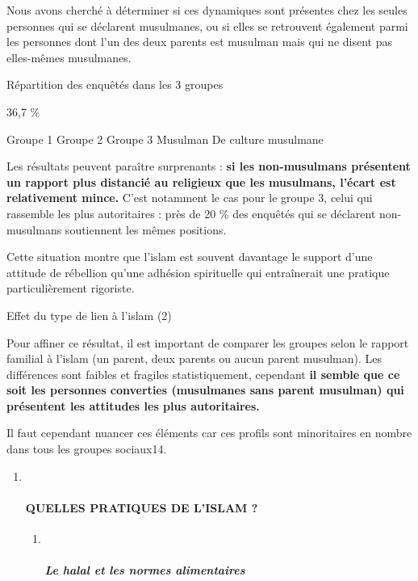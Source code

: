 Nous avons cherché à déterminer si ces dynamiques sont présentes chez
les seules personnes qui se déclarent musulmanes, ou si elles se
retrouvent également parmi les personnes dont l'un des deux parents est
musulman mais qui ne disent pas elles-mêmes musulmanes.


Répartition des enquêtés dans les 3 groupes


36,7 \%

Groupe 1 Groupe 2 Groupe 3 Musulman De culture musulmane

Les résultats peuvent paraître surprenants : \textbf{si les
non-musulmans présentent un rapport plus distancié au religieux que les
musulmans, l'écart est relativement mince.} C'est notamment le cas pour
le groupe 3, celui qui rassemble les plus autoritaires : près de 20 \%
des enquêtés qui se déclarent non-musulmans soutiennent les mêmes
positions.



Cette situation montre que l'islam est souvent davantage le support
d'une attitude de rébellion qu'une adhésion spirituelle qui entraînerait
une pratique particulièrement rigoriste.


Effet du type de lien à l'islam (2)


Pour affiner ce résultat, il est important de comparer les groupes selon
le rapport familial à l'islam (un parent, deux parents ou aucun parent
musulman). Les différences sont faibles et fragiles statistiquement,
cependant \textbf{il semble que ce soit les personnes converties
(musulmanes sans parent musulman) qui présentent les attitudes les plus
autoritaires.}

Il faut cependant nuancer ces éléments car ces profils sont minoritaires
en nombre dans tous les groupes sociaux14.


\begin{enumerate}
\def\labelenumi{\arabic{enumi}.}
\item ~
  \hypertarget{quelles-pratiques-de-lislam}{%
  \paragraph{QUELLES PRATIQUES DE L'ISLAM
  ?}\label{quelles-pratiques-de-lislam}}

  \begin{enumerate}
  \def\labelenumii{\arabic{enumii}.}
  \item ~
    \hypertarget{le-halal-et-les-normes-alimentaires}{%
    \subparagraph{Le halal et les normes
    alimentaires}\label{le-halal-et-les-normes-alimentaires}}
  \end{enumerate}
\end{enumerate}


